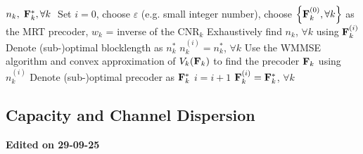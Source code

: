 \documentclass[a4paper, 12pt, onecolumn, journal, twoside, draftclsnofoot]{IEEEtran}
\begin{document}
\begin{algorithm}[H]
	\caption{Proposed latency minimization algorithm in the uplink via precoder.}
\label{alg_latency_min}
\begin{algorithmic}[1]
    \Ensure $n_k, \; {\bf F}_k^*, \forall k \;$
    \Require Set $i  = 0$, choose $\varepsilon$ (e.g. small integer number), choose $\left\{ {\bf F}_k^{(0)}, \forall k \right\}$ as the MRT precoder, $w_k$ = inverse of the $\text{CNR}_k$ %
	\Repeat
		\State Exhaustively find $n_k$, $\forall k$ using ${\bf F}_k^{(i)}$
		\State Denote (sub-)optimal blocklength as $n_k^*$
		\State $n_k^{(i)} = n_k^*$, $\forall k$
			\State Use the WMMSE algorithm and convex approximation of $V_k({\bf F}_k)$ to find the precoder ${\bf F}_k$ using $n_k^{(i)}$
			\State Denote (sub-)optimal precoder as ${\bf F}_k^*$
    	\EndFor
    	\State $i = i + 1$
    	\State ${\bf F}_k^{(i)} = {\bf F}_k^*$, $\forall k$
\end{algorithmic}
\end{algorithm}


%

\subsection{Capacity and Channel Dispersion}
\textbf{Edited on 29-09-25}
\end{document}
